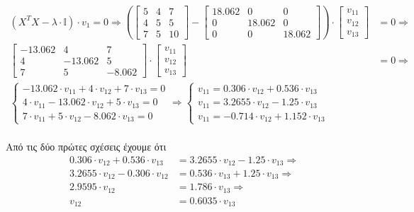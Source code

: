 \documentclass{article}
\begin{document}
	\begin{align*}
		(X^TX - λ \cdot \mathbb{I}) \cdot v_{1} = 0 \Rightarrow
		\left(	
		\begin{bmatrix}
			5 & 4 & 7 \\
			4 & 5 & 5 \\
			7 & 5 & 10 
		\end{bmatrix} - 
		\begin{bmatrix}
			18.062 & 0 & 0 \\
			0 & 18.062 & 0 \\
			0 & 0 & 18.062
		\end{bmatrix}
		\right) 
		\cdot
		\begin{bmatrix}
			v_{11} \\
		    v_{12} \\
		    v_{13}
		\end{bmatrix} &= 0 \Rightarrow\\	
		\begin{bmatrix}
			-13.062 & 4 & 7 \\
			4 & -13.062 & 5 \\
			7 & 5 & -8.062 
		\end{bmatrix}
		\cdot
		\begin{bmatrix}
			v_{11} \\
			v_{12} \\
			v_{13}
		\end{bmatrix} &= 0 \Rightarrow\\
		\begin{cases}
			-13.062 \cdot v_{11} + 4 \cdot v_{12} + 7 \cdot v_{13} = 0 \\
			4 \cdot v_{11} - 13.062 \cdot v_{12} + 5 \cdot v_{13} = 0 \\
			7 \cdot v_{11} + 5 \cdot v_{12} - 8.062 \cdot v_{13} = 0 
		\end{cases} \Rightarrow 
		\begin{cases}
			v_{11} = 0.306 \cdot v_{12} + 0.536 \cdot v_{13}  \\
			v_{11} = 3.2655 \cdot v_{12} - 1.25 \cdot v_{13} \\
			v_{11} = -0.714 \cdot v_{12} + 1.152 \cdot v_{13} 
		\end{cases}
	\end{align*}
	\\
	\noindent
	Aπό τις δύο πρώτες σχέσεις έχουμε ότι
	\begin{align*}	
		 0.306 \cdot v_{12} + 0.536 \cdot v_{13} &= 3.2655 \cdot v_{12} - 1.25 \cdot v_{13} \Rightarrow \\
		  3.2655 \cdot v_{12} -  0.306 \cdot v_{12} &= 0.536 \cdot v_{13} + 1.25 \cdot v_{13} \Rightarrow \\
		  2.9595 \cdot v_{12} &= 1.786 \cdot v_{13} \Rightarrow \\
		  v_{12} &= 0.6035 \cdot v_{13}
	\end{align*}
	
\end{document}
